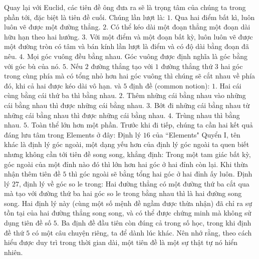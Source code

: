 \begin{multicols}{2}
	\vskip 0.1cm
	Quay lại với Euclid, các tiên đề ông đưa ra sẽ là trọng tâm của chúng ta trong phần tới, đặc biệt là tiên đề cuối. Chúng lần lượt là:
	\vskip 0.1cm
	$1.$ Qua hai điểm bất kì, luôn luôn vẽ được một đường thẳng.
	\vskip 0.1cm
	$2.$ Có thể kéo dài một đoạn thẳng một đoạn dài hữu hạn theo hai hướng.
	\vskip 0.1cm
	$3.$ Với một điểm và một đoạn bất kỳ, luôn luôn vẽ được một đường tròn có tâm và bán kính lần lượt là điểm và có độ dài bằng đoạn đã nêu. 
	\vskip 0.1cm
	$4.$ Mọi góc vuông đều bằng nhau. Góc vuông được định nghĩa là góc bằng với góc bù của nó.
	\vskip 0.1cm
	$5.$ Nếu $2$ đường thẳng tạo với $1$ đường thẳng thứ $3$ hai góc trong cùng phía mà có tổng nhỏ hơn hai góc vuông thì chúng sẽ cắt nhau về phía đó, khi cả hai được kéo dài vô hạn.
	\vskip 0.1cm
	và $5$ định đề (common notion):
	\vskip 0.1cm
	$1.$ Hai cái cùng bằng cái thứ ba thì bằng nhau. 
	\vskip 0.1cm
	$2.$ Thêm những cái bằng nhau vào những cái bằng nhau thì được những cái bằng nhau.
	\vskip 0.1cm
	$3.$ Bớt đi những cái bằng nhau từ những cái bằng nhau thì được những cái bằng nhau.
	\vskip 0.1cm
	$4.$ Trùng nhau thì bằng nhau.
	\vskip 0.1cm
	$5.$ Toàn thể lớn hơn một phần.
	\vskip 0.1cm
	Trước khi đi tiếp, chúng ta cần hai kết quả đáng lưu tâm trong Elements ở đây:
	\vskip 0.1cm
	Định lý $16$ của ``Elements" Quyển I, tên khác là định lý góc ngoài, một dạng yếu hơn của định lý góc ngoài ta quen biết nhưng không cần tới tiên đề song song, khẳng định: 
	\vskip 0.1cm
	Trong một tam giác bất kỳ, góc ngoài của một đỉnh nào đó thì lớn hơn hai góc ở hai đỉnh còn lại.
	\vskip 0.1cm
	Khi thừa nhận thêm tiên đề $5$ thì góc ngoài sẽ bằng tổng hai góc ở hai đỉnh ấy luôn.
	\vskip 0.1cm
	Định lý $27$, định lý về góc so le trong: 
	\vskip 0.1cm
	Hai đường thẳng có một đường thứ ba cắt qua mà tạo với đường thứ ba hai góc so le trong bằng nhau thì là hai đường song song.
	\vskip 0.1cm
	Hai định lý này (cùng một số mệnh đề ngầm được thừa nhận) đã chỉ ra sự tồn tại của hai đường thẳng song song, và có thể được chứng minh mà không sử dụng tiên đề số $5$. Ba định đề đầu tiên còn đúng cả trong số học, trong khi định đề thứ $5$ có một câu chuyện riêng, ta để dành lúc khác. Nên nhớ rằng, theo cách hiểu được duy trì trong thời gian dài, một tiên đề là một sự thật tự nó hiển nhiên. 
	\vskip 0.1cm

\end{multicols}
